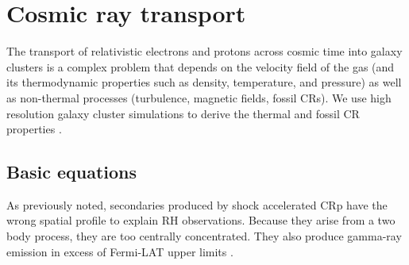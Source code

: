 \documentclass[fleqn,usenatbib,useAMS]{mnras}
\begin{document}
\section{Cosmic ray transport}
\label{sect:method} 

The transport of relativistic electrons and protons across cosmic time
into galaxy clusters is a complex problem that depends on the velocity
field of the gas (and its thermodynamic properties such as density,
temperature, and pressure) as well as non-thermal processes
(turbulence, magnetic fields, fossil CRs). We use high resolution
galaxy cluster simulations to derive the thermal and fossil CR
properties \citep[shock accelerated primary CRes and CRps, as well as
  secondary CRes produced in p-p collisions,
  see][]{2007MNRAS.378..385P,pfrommer08,pinzke10,pinzke13}.


\subsection{Basic equations}
As previously noted, secondaries produced by shock accelerated CRp
have the wrong spatial profile to explain RH observations. Because
they arise from a two body process, they are too centrally
concentrated. They also produce gamma-ray emission in excess of
Fermi-LAT upper limits
\citep{2012ApJ...757..123A,brunetti12,2014ApJ...787...18A,Ahnen2016}. 
\end{document}
